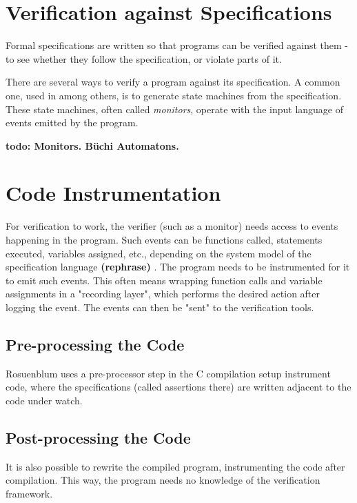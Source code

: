 \documentclass[a4paper,11pt]{kth-mag}
\newcommand{\todo}[1]{\textbf{todo: #1}}
\newcommand{\rephrase}{\textbf{(rephrase)} }
\begin{document}
\section{Verification against Specifications} \label{section-verification}

Formal specifications are written so that programs can be verified against them
- to see whether they follow the specification, or violate parts of it.

There are several ways to verify a program against its specification. A common
one, used in \cite{bauer06monitoring,bodden05efficientrv} among others, is to
generate state machines from the specification. These state machines, often
called \textit{monitors}, operate with the input language of events emitted by
the program.

\todo{Monitors. Büchi Automatons.}


\section{Code Instrumentation} \label{section-instrumentation}

For verification to work, the verifier (such as a monitor) needs access to
events happening in the program. Such events can be functions called,
statements executed, variables assigned, etc., depending on the system model of
the specification language \rephrase. The program needs to be instrumented for
it to emit such events. This often means wrapping function calls and variable
assignments in a "recording layer", which performs the desired action after
logging the event. The events can then be "sent" to the verification tools.


\subsection{Pre-processing the Code}

Rosuenblum \cite{rosenblum95practicalassertions} uses a pre-processor step in
the C compilation setup instrument code, where the specifications (called
assertions there) are written adjacent to the code under watch.


\subsection{Post-processing the Code}

It is also possible to rewrite the compiled program, instrumenting the code
after compilation. This way, the program needs no knowledge of the verification
framework.
\end{document}
